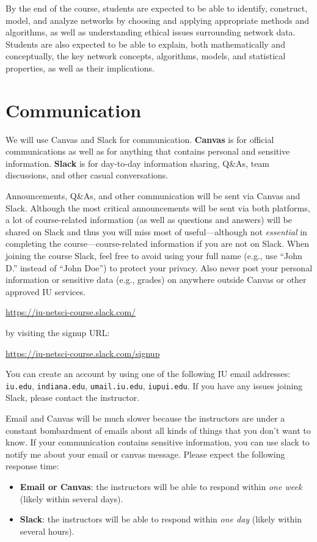 \documentclass[11pt,article,oneside]{memoir} %
\begin{document}
By the end of the course, students are expected to be able to identify, construct, model, and analyze networks by choosing and applying appropriate methods and algorithms, as well as understanding ethical issues surrounding network data.
Students are also expected to be able to explain, both mathematically and conceptually, the key network concepts, algorithms, models, and statistical properties, as well as their implications.
\section{Communication} %

We will use Canvas and Slack for communication. \textbf{Canvas} is for official communications as well as for anything that contains personal and sensitive information. \textbf{Slack} is for day-to-day information sharing, Q\&As, team discussions, and other casual conversations. 

Announcements, Q\&As, and other communication will be sent via Canvas and Slack. 
Although the most critical announcements will be sent via both platforms, a lot of course-related information (as well as questions and answers) will be shared on Slack and thus you will miss most of useful---although not \emph{essential} in completing the course---course-related information if you are not on Slack. 
When joining the course Slack, feel free to avoid using your full name (e.g., use ``John D.'' instead of ``John Doe'') to protect your privacy. 
Also never post your personal information or sensitive data (e.g., grades) on anywhere outside Canvas or other approved IU services. 

\url{https://iu-netsci-course.slack.com/}

by visiting the signup URL:

\url{https://iu-netsci-course.slack.com/signup}

You can create an account by using one of the following IU email addresses: \texttt{iu.edu}, \texttt{indiana.edu}, \texttt{umail.iu.edu}, \texttt{iupui.edu}.
If you have any issues joining Slack, please contact the instructor.

Email and Canvas will be much slower because the instructors are under a constant bombardment of emails about all kinds of things that you don't want to know. If your communication contains sensitive information, you can use slack to notify me about your email or canvas message. Please expect the following response time:

\begin{itemize}
\item \textbf{Email or Canvas}: the instructors will be able to respond within \emph{one week} (likely within several days).
\item \textbf{Slack}: the instructors will be able to respond within \emph{one day} (likely within several hours).

\end{itemize}
\end{document}
